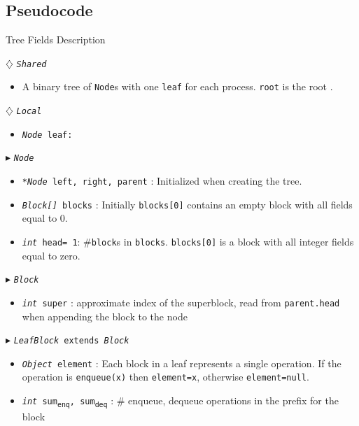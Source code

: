 \documentclass[10pt]{article}
\newcommand{\sub}[1]{\textsubscript{#1}}
\renewcommand{\tt}[1]{\texttt{#1}}
\renewcommand{\sl}[1]{\textsl{#1}}
\newcommand{\nf}[1]{{\normalfont{\texttt{#1}}}}
\newcommand{\head}{head}
\theoremstyle{definition}
\begin{document}
\subsection{Pseudocode}
\begin{algorithm}
\caption{Tree Fields Description}
\begin{algorithmic}[1]
\setcounter{ALG@line}{100}
\begin{multicols}{2}

\Statex $\diamondsuit$ \tt{\sl{Shared}}
\begin{itemize}
\item \textsf{A binary tree of \tt{Node}s with one \tt{leaf} for each process. \tt{root} is the root \nf{node}.}
\end{itemize}

\Statex $\diamondsuit$ \tt{\sl{Local}}
\begin{itemize}
\item \tt{\sl{Node} leaf:} 
\end{itemize}

\Statex $\blacktriangleright$ \tt{\sl{Node}}
\begin{itemize}
\item \tt{\sl{*Node} left, right, parent} \textsf{: Initialized  when creating the tree.}
\item \tt{\sl{Block[]} blocks} \textsf{: Initially \tt{blocks[0]} contains an empty block with all fields equal to 0.}
\item \tt{\sl{int} \head= 1}\textsf{: \#\tt{block}s in \tt{blocks}. \tt{blocks[0]} is a block with all integer fields equal to zero.}
\end{itemize}

\Statex $\blacktriangleright$ \tt{\sl{Block}} 

\begin{itemize}
  \item \tt{\sl{int} super}
  \textsf{: approximate index of the superblock, read from \tt{parent.head} when appending the block to the node}
\end{itemize}

\Statex $\blacktriangleright$ \tt{\sl{LeafBlock} extends \sl{Block}}
\begin{itemize}
  \item \tt{\sl{Object} element}
  \textsf{: Each block in a leaf represents a single operation. If the operation is \tt{enqueue(x)} then \tt{element=x}, otherwise \tt{element=null}.}
  
    \item \tt{\sl{int} sum\sub{enq}, sum\sub{deq}}
  \textsf{: \# enqueue, dequeue operations in the prefix for the block}
  

\end{itemize}
\end{multicols}
\end{algorithmic}
\end{algorithm}
\end{document}
